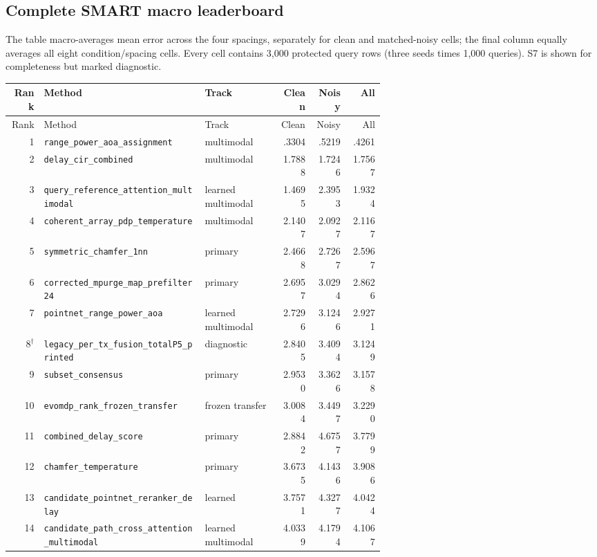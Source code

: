 \documentclass[10pt]{article}
\newcommand{\code}[1]{\nolinkurl{#1}}
\begin{document}
\subsection{Complete SMART macro leaderboard}

The table macro-averages mean error across the four spacings, separately for
clean and matched-noisy cells; the final column equally averages all eight
condition/spacing cells.  Every cell contains 3,000 protected query rows (three
seeds times 1,000 queries).  S7 is shown for completeness but marked diagnostic.

\scriptsize
\begin{longtable}{@{}r p{0.43\linewidth}p{0.20\linewidth}rrr@{}}
\toprule Rank & Method & Track & Clean & Noisy & All\\\midrule
\endfirsthead\toprule Rank & Method & Track & Clean & Noisy & All\\\midrule\endhead
1 & \code{range_power_aoa_assignment} & multimodal & .3304 & .5219 & .4261\\
2 & \code{delay_cir_combined} & multimodal & 1.7888 & 1.7246 & 1.7567\\
3 & \code{query_reference_attention_multimodal} & learned multimodal & 1.4695 & 2.3953 & 1.9324\\
4 & \code{coherent_array_pdp_temperature} & multimodal & 2.1407 & 2.0927 & 2.1167\\
5 & \code{symmetric_chamfer_1nn} & primary & 2.4668 & 2.7267 & 2.5967\\
6 & \code{corrected_mpurge_map_prefilter24} & primary & 2.6957 & 3.0294 & 2.8626\\
7 & \code{pointnet_range_power_aoa} & learned multimodal & 2.7296 & 3.1246 & 2.9271\\
8$^\dagger$ & \code{legacy_per_tx_fusion_totalP5_printed} & diagnostic & 2.8405 & 3.4094 & 3.1249\\
9 & \code{subset_consensus} & primary & 2.9530 & 3.3626 & 3.1578\\
10 & \code{evomdp_rank_frozen_transfer} & frozen transfer & 3.0084 & 3.4497 & 3.2290\\
11 & \code{combined_delay_score} & primary & 2.8842 & 4.6757 & 3.7799\\
12 & \code{chamfer_temperature} & primary & 3.6735 & 4.1436 & 3.9086\\
13 & \code{candidate_pointnet_reranker_delay} & learned & 3.7571 & 4.3277 & 4.0424\\
14 & \code{candidate_path_cross_attention_multimodal} & learned multimodal & 4.0339 & 4.1794 & 4.1067\\

\end{longtable}
\end{document}
